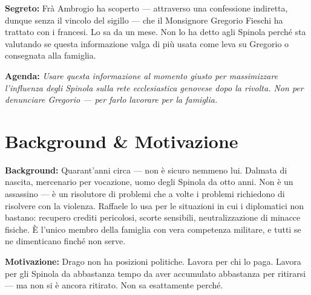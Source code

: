 \clearpage

\begin{secretbox}
  \textbf{Segreto:} Frà Ambrogio ha scoperto — attraverso una confessione
  indiretta, dunque senza il vincolo del sigillo — che il Monsignore Gregorio
  Fieschi ha trattato con i francesi. Lo sa da un mese. Non lo ha detto agli
  Spinola perché sta valutando se questa informazione valga di più usata come
  leva su Gregorio o consegnata alla famiglia.

  \medskip\noindent\textcolor{SecretRed}{\textbf{Agenda:}}
  \textit{Usare questa informazione al momento giusto per massimizzare
  l'influenza degli Spinola sulla rete ecclesiastica genovese dopo la rivolta.
  Non per denunciare Gregorio — per farlo lavorare per la famiglia.}
\end{secretbox}

\clearpage



\section*{Background \& Motivazione}

\begin{rulebox}{}
  \textbf{Background:} Quarant'anni circa — non è sicuro nemmeno lui.
  Dalmata di nascita, mercenario per vocazione, uomo degli Spinola da
  otto anni. Non è un assassino — è un risolutore di problemi che a volte
  i problemi richiedono di risolvere con la violenza. Raffaele lo usa per
  le situazioni in cui i diplomatici non bastano: recupero crediti pericolosi,
  scorte sensibili, neutralizzazione di minacce fisiche. È l'unico membro
  della famiglia con vera competenza militare, e tutti se ne dimenticano
  finché non serve.

  \medskip\noindent\textcolor{SpinolaRed}{\textbf{Motivazione:}} Drago
  non ha posizioni politiche. Lavora per chi lo paga. Lavora per gli
  Spinola da abbastanza tempo da aver accumulato abbastanza per ritirarsi
  — ma non si è ancora ritirato. Non sa esattamente perché.
\end{rulebox}

